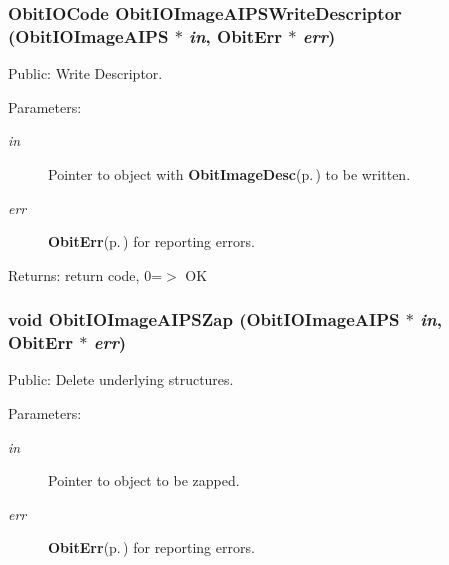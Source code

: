 \subsubsection{\setlength{\rightskip}{0pt plus 5cm}Obit\-IOCode Obit\-IOImage\-AIPSWrite\-Descriptor ({\bf Obit\-IOImage\-AIPS} $\ast$ {\em in}, {\bf Obit\-Err} $\ast$ {\em err})}\label{ObitIOImageAIPS_8h_a17}


Public: Write Descriptor. 

\begin{Desc}
\item[Parameters:]
\begin{description}
\item[{\em in}]Pointer to object with {\bf Obit\-Image\-Desc}{\rm (p.\,\pageref{structObitImageDesc})} to be written. \item[{\em err}]{\bf Obit\-Err}{\rm (p.\,\pageref{structObitErr})} for reporting errors. \end{description}
\end{Desc}
\begin{Desc}
\item[Returns:]return code, 0=$>$ OK \end{Desc}
\subsubsection{\setlength{\rightskip}{0pt plus 5cm}void Obit\-IOImage\-AIPSZap ({\bf Obit\-IOImage\-AIPS} $\ast$ {\em in}, {\bf Obit\-Err} $\ast$ {\em err})}\label{ObitIOImageAIPS_8h_a8}


Public: Delete underlying structures. 

\begin{Desc}
\item[Parameters:]
\begin{description}
\item[{\em in}]Pointer to object to be zapped. \item[{\em err}]{\bf Obit\-Err}{\rm (p.\,\pageref{structObitErr})} for reporting errors. \end{description}
\end{Desc}
